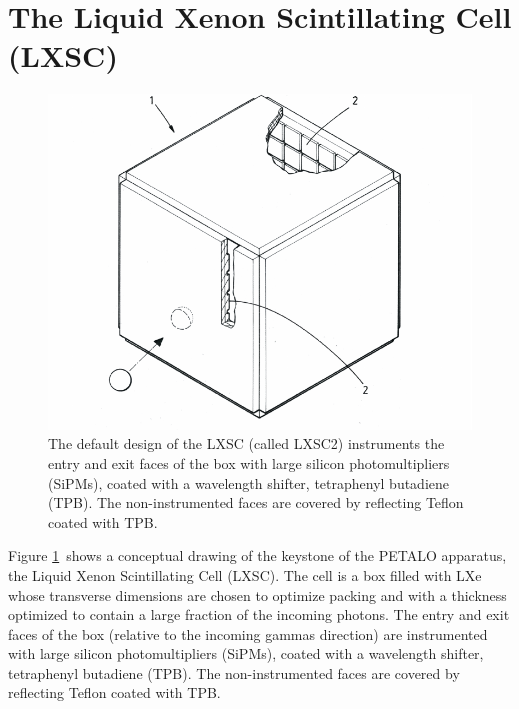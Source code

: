 \section{The Liquid Xenon Scintillating Cell (LXSC)}
\label{sec.lxsc}

\begin{figure}[!htb]
	\centering
	
	\includegraphics[scale=1.0]{img/LXSC2.pdf}
	\caption{\label{fig.box} The default design of the LXSC (called LXSC2) instruments the entry and exit faces of the box with large silicon photomultipliers (SiPMs), coated with a wavelength shifter, tetraphenyl butadiene (TPB). The non-instrumented faces are covered by reflecting Teflon coated with TPB.  }
\end{figure}

Figure \ref{fig.box}~shows a conceptual drawing of the keystone of the PETALO apparatus, the Liquid Xenon Scintillating Cell (LXSC). The cell is a box  filled with LXe whose transverse dimensions are chosen to optimize packing and with a thickness optimized to contain a large fraction of the incoming photons. The entry and exit faces of the box (relative to the incoming gammas direction) are instrumented with large silicon photomultipliers (SiPMs), coated with a wavelength shifter, tetraphenyl butadiene (TPB). The non-instrumented faces are covered by reflecting Teflon coated with TPB. 


